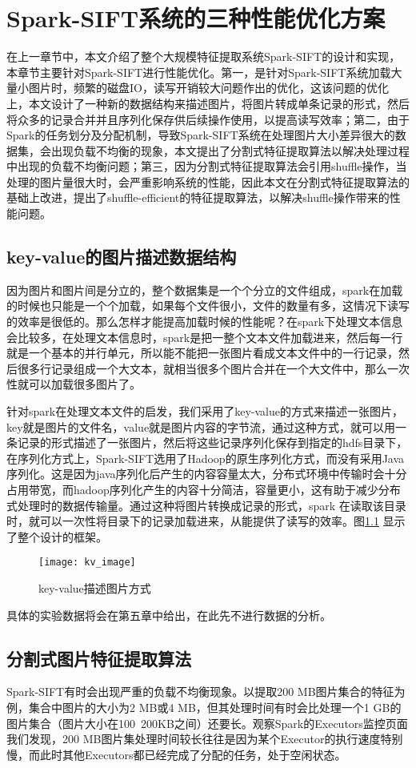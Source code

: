 ﻿\chapter{Spark-SIFT系统的三种性能优化方案}
在上一章节中，本文介绍了整个大规模特征提取系统Spark-SIFT的设计和实现，本章节主要针对Spark-SIFT进行性能优化。第一，是针对Spark-SIFT系统加载大量小图片时，频繁的磁盘IO，读写开销较大问题作出的优化，这该问题的优化上，本文设计了一种新的数据结构来描述图片，将图片转成单条记录的形式，然后将众多的记录合并并且序列化保存供后续操作使用，以提高读写效率；第二，由于Spark的任务划分及分配机制，导致Spark-SIFT系统在处理图片大小差异很大的数据集，会出现负载不均衡的现象，本文提出了分割式特征提取算法以解决处理过程中出现的负载不均衡问题；第三，因为分割式特征提取算法会引用shuffle操作，当处理的图片量很大时，会严重影响系统的性能，因此本文在分割式特征提取算法的基础上改进，提出了shuffle-efficient的特征提取算法，以解决shuffle操作带来的性能问题。

\section{key-value的图片描述数据结构}
因为图片和图片间是分立的，整个数据集是一个个分立的文件组成，spark在加载的时候也只能是一个个加载，如果每个文件很小，文件的数量有多，这情况下读写的效率是很低的。那么怎样才能提高加载时候的性能呢？在spark下处理文本信息会比较多，在处理文本信息时，spark是把一整个文本文件加载进来，然后每一行就是一个基本的并行单元，所以能不能把一张图片看成文本文件中的一行记录，然后很多行记录组成一个大文本，就相当很多个图片合并在一个大文件中，那么一次性就可以加载很多图片了。

针对spark在处理文本文件的启发，我们采用了key-value的方式来描述一张图片，key就是图片的文件名，value就是图片内容的字节流，通过这种方式，就可以用一条记录的形式描述了一张图片，然后将这些记录序列化保存到指定的hdfs目录下，在序列化方式上，Spark-SIFT选用了Hadoop的原生序列化方式，而没有采用Java序列化。这是因为java序列化后产生的内容容量太大，分布式环境中传输时会十分占用带宽，而hadoop序列化产生的内容十分简洁，容量更小，这有助于减少分布式处理时的数据传输量。通过这种将图片转换成记录的形式，spark 在读取该目录时，就可以一次性将目录下的记录加载进来，从能提供了读写的效率。图\ref{fig:kv_image} 显示了整个设计的框架。
\begin{figure}[htp]
\centering
\texttt{[image: kv\_image]}
\caption{key-value描述图片方式}
\label{fig:kv_image}
\end{figure}

具体的实验数据将会在第五章中给出，在此先不进行数据的分析。
\section{分割式图片特征提取算法}
Spark-SIFT有时会出现严重的负载不均衡现象。以提取200 MB图片集合的特征为例，集合中图片的大小为2 MB或4 MB，但其处理时间有时会比处理一个1 GB的图片集合（图片大小在100~200KB之间）还要长。观察Spark的Executors监控页面我们发现，200 MB图片集处理时间较长往往是因为某个Executor的执行速度特别慢，而此时其他Executors都已经完成了分配的任务，处于空闲状态。

